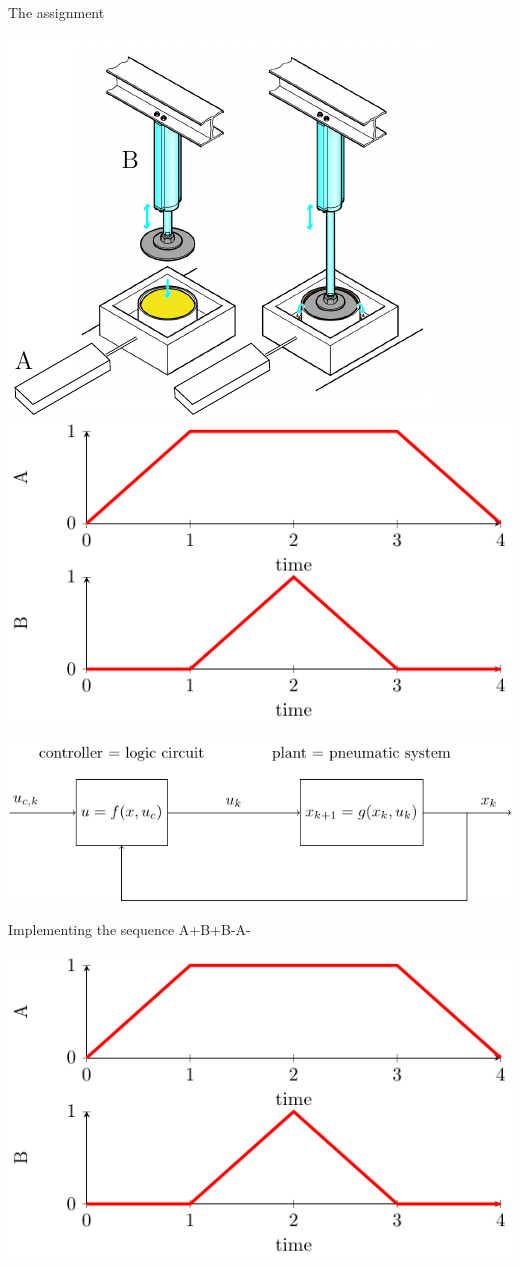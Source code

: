 \documentclass[presentation,aspectratio=1610]{beamer}
\begin{document}
\begin{frame}[label={sec:org0c637fc}]{The assignment}
\begin{center}
\includegraphics[width=0.4\linewidth]{../../figures/cheese-pressing-two-cylinders}
 \includegraphics[width=0.58\linewidth]{../../figures/AplusBplusBminAmin}
\end{center}

\begin{center}
\includegraphics[width=0.8\linewidth]{../../figures/logic-control-loop}
\end{center}
\end{frame}

\begin{frame}[label={sec:org2089e92}]{Implementing the sequence A+B+B-A-}
\begin{center}
\includegraphics[width=0.8\linewidth]{../../figures/AplusBplusBminAmin}
\end{center}
\end{frame}
\end{document}
